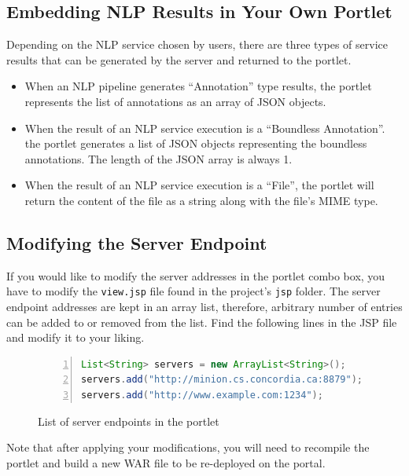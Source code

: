 \subsection{Embedding NLP Results in Your Own Portlet}
Depending on the NLP service chosen by users, there are three types of service results that can be generated by the \sa server and returned to the portlet.

\begin{itemize}
\item When an NLP pipeline generates ``Annotation'' type results, the \sa portlet represents the list of annotations as an array of JSON objects.
\item When the result of an NLP service execution is a ``Boundless Annotation''. the \sa portlet generates a list of JSON objects representing the boundless annotations. The length of the JSON array is always 1.
\item When the result of an NLP service execution is a ``File'', the \sa portlet will return the content of the file as a string along with the file's MIME type.
\end{itemize}

\subsection{Modifying the \sa Server Endpoint}
If you would like to modify the \sa server addresses in the portlet combo box, you have to modify the \texttt{view.jsp} file found in the project's \texttt{jsp} folder. The server endpoint addresses are kept in an array list, therefore, arbitrary number of entries can be added to or removed from the list. Find the following lines in the JSP file and modify it to your liking.

\begin{figure}[h!]
\centering
\begin{lstlisting}[language=Java,numbers=left,xleftmargin=4mm,columns=flexible]
List<String> servers = new ArrayList<String>();
servers.add("http://minion.cs.concordia.ca:8879");
servers.add("http://www.example.com:1234");
\end{lstlisting}
\caption{List of \sa server endpoints in the portlet}
\label{list:portal_server_addresses}
\end{figure}

Note that after applying your modifications, you will need to recompile the portlet and build a new WAR file to be re-deployed on the portal.

\label{sec:server_change}